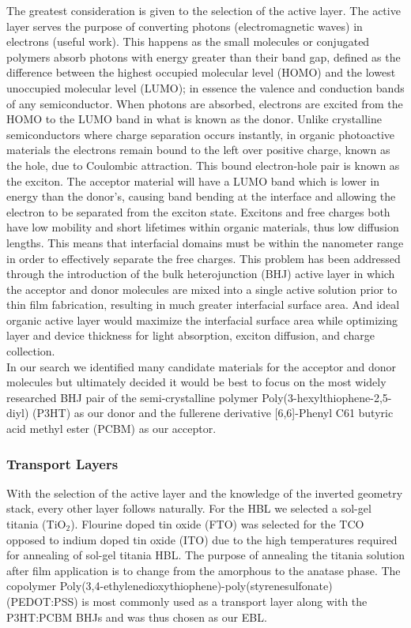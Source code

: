 	The greatest consideration is given to the selection of the active layer. The active layer serves the purpose of converting photons (electromagnetic waves) in electrons (useful work)\cite{operation}. This happens as the small molecules or conjugated polymers absorb photons with energy greater than their band gap, defined as the difference between the highest occupied molecular level (HOMO) and the lowest unoccupied molecular level (LUMO); in essence the valence and conduction bands of any semiconductor. When photons are absorbed, electrons are excited from the HOMO to the LUMO band in what is known as the donor. Unlike crystalline semiconductors where charge separation occurs instantly, in organic photoactive materials the electrons remain bound to the left over positive charge, known as the hole, due to Coulombic attraction. This bound electron-hole pair is known as the exciton. The acceptor material will have a LUMO band which is lower in energy than the donor's, causing band bending at the interface and allowing the electron to be separated from the exciton state. Excitons and free charges both have low mobility and short lifetimes within organic materials, thus low diffusion lengths. This means that interfacial domains must be within the nanometer range in order to effectively separate the free charges. This problem has been addressed through the introduction of the bulk heterojunction (BHJ) active layer in which the acceptor and donor molecules are mixed into a single active solution prior to thin film fabrication, resulting in much greater interfacial surface area. And ideal organic active layer would maximize the interfacial surface area while optimizing layer and device thickness for light absorption, exciton diffusion, and charge collection.\\
	
	In our search we identified many candidate materials for the acceptor and donor molecules but ultimately decided it would be best to focus on the most widely researched BHJ pair of the semi-crystalline polymer Poly(3-hexylthiophene-2,5-diyl) (P3HT) as our donor and the fullerene derivative [6,6]-Phenyl C61 butyric acid methyl ester (PCBM) as our acceptor.\\
	
\subsubsection{Transport Layers}
	
	With the selection of the active layer and the knowledge of the inverted geometry stack, every other layer follows naturally. For the HBL we selected a sol-gel titania (TiO$_2$)\cite{HBL}. Flourine doped tin oxide (FTO) was selected for the TCO opposed to indium doped tin oxide (ITO) due to the high temperatures required for annealing of sol-gel titania HBL. The purpose of annealing the titania solution after film application is to change from the amorphous to the anatase phase. The copolymer Poly(3,4-ethylenedioxythiophene)-poly(styrenesulfonate) (PEDOT:PSS) is most commonly used as a transport layer along with the P3HT:PCBM BHJs and was thus chosen as our EBL.
	
